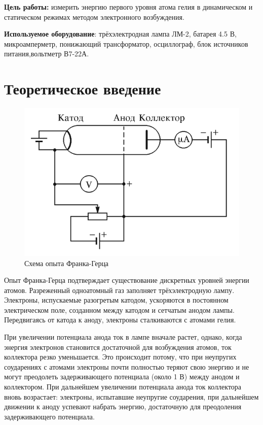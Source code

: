 \textbf{Цель работы:} измерить энергию первого уровня атома гелия в динамическом и статическом режимах методом электронного возбуждения.

\textbf{Используемое оборудование}: трёхэлектродная лампа ЛМ-2, батарея 4.5 В, микроамперметр, понижающий трансформатор, осциллограф, блок источников питания,вольтметр В7-22А.
             
\section{Теоретическое введение}

    \begin{figure}[!h]
        \centering
        \includegraphics[width = 10 cm]{images/exp_scheme}
        \caption{Схема опыта Франка-Герца}
        \label{fig:vac}
    \end{figure}

    Опыт Франка-Герца подтверждает существование дискретных уровней энергии атомов. Разреженный одноатомный газ заполняет трёхэлектродную лампу. Электроны, испускаемые разогретым катодом, ускоряются в постоянном электрическом поле, созданном между катодом и сетчатым анодом лампы. Передвигаясь от катода к аноду, электроны сталкиваются с атомами гелия.

    При увеличении потенциала анода ток в лампе вначале растет, однако, когда энергия электронов становится достаточной для возбуждения
    атомов, ток коллектора резко уменьшается. Это происходит потому, что при неупругих соударениях с атомами электроны почти полностью теряют свою энергию и не могут преодолеть задерживающего потенциала (около 1 В) между анодом и коллектором. При дальнейшем увеличении потенциала анода ток коллектора вновь возрастает: электроны, испытавшие неупругие соударения, при дальнейшем движении к аноду успевают набрать энергию, достаточную для преодоления задерживающего потенциала.

